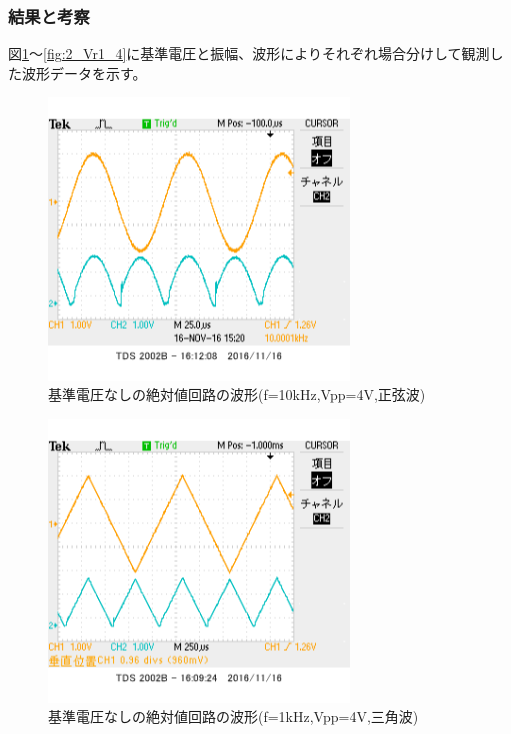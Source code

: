 \documentclass[11pt,a4j]{jsarticle}
\begin{document}
   \subsubsection{結果と考察}
    
    図\ref{fig:2_Vr0_sin}～\ref{fig:2_Vr1_4}に基準電圧と振幅、波形によりそれぞれ場合分けして観測した波形データを示す。
    
    \begin{figure}[htbp]
  \centering
  \includegraphics[width=8cm,clip]{2_abs_Vr0_f10V4sin_ViVo.png}
  \caption{基準電圧なしの絶対値回路の波形(f=10kHz,Vpp=4V,正弦波)}
  \label{fig:2_Vr0_sin}
 \end{figure}%
    
    
    \begin{figure}[htbp]
  \centering
  \includegraphics[width=8cm,clip]{2_abs_Vr0_f1V4sankaku_ViVo.png}
  \caption{基準電圧なしの絶対値回路の波形(f=1kHz,Vpp=4V,三角波)}
  \label{fig:2_Vr0_sankaku}
 \end{figure}%
  
\end{document}

